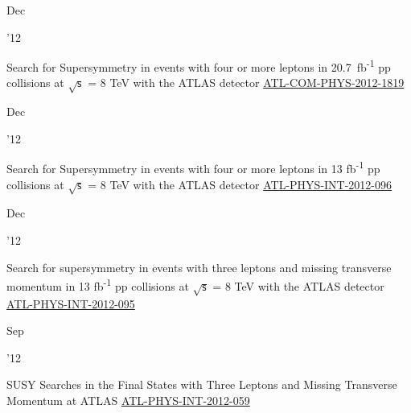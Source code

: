 \documentclass[]{cv} %
\begin{document}
\begin{entrylist}
\entry
{\parbox[t]{\parboxWidthOne}{Dec}\parbox[t]{\parboxWidthTwo}{\hfill '12}}
{Search for Supersymmetry in events with four or more leptons in 20.7~fb\textsuperscript{-1} pp collisions at $\sqrt{\mathsf{s}}$
= 8 TeV with the ATLAS detector}
{\href{https://cds.cern.ch/record/1501709}{ATL-COM-PHYS-2012-1819}}
{\vspace*{\spacingPubs}}

\entry
{\parbox[t]{\parboxWidthOne}{Dec}\parbox[t]{\parboxWidthTwo}{\hfill '12}}
{Search for Supersymmetry in events with four or more leptons in 13 fb\textsuperscript{-1} pp collisions at $\sqrt{\mathsf{s}}$ =
8 TeV with the ATLAS detector}
{\href{https://cds.cern.ch/record/1498627}{ATL-PHYS-INT-2012-096}}
{\vspace*{\spacingPubs}}

\entry
{\parbox[t]{\parboxWidthOne}{Dec}\parbox[t]{\parboxWidthTwo}{\hfill '12}}
{Search for supersymmetry in events with three leptons and missing transverse momentum in 13 fb\textsuperscript{-1} pp collisions
at $\sqrt{\mathsf{s}}$ = 8 TeV with the ATLAS detector}
{\href{https://cds.cern.ch/record/1498390}{ATL-PHYS-INT-2012-095}}
{\vspace*{\spacingPubs}}

\entry
{\parbox[t]{\parboxWidthOne}{Sep}\parbox[t]{\parboxWidthTwo}{\hfill '12}}
{SUSY Searches in the Final States with Three Leptons and Missing Transverse Momentum at ATLAS}
{\href{https://cds.cern.ch/record/1482141}{ATL-PHYS-INT-2012-059}}
{\vspace*{\spacingPubs}}

\end{entrylist}
\fi
\end{document}
